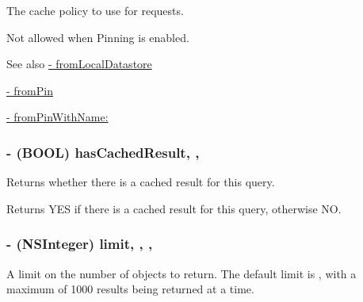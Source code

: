  





The cache policy to use for requests.

Not allowed when Pinning is enabled.

\begin{DoxySeeAlso}{See also}
\hyperlink{class_p_f_query_a04816c50721c554db2349cfbe637472f}{-\/ from\+Local\+Datastore} 

\hyperlink{class_p_f_query_aec25334cc9bf9c212e0e0d6587603787}{-\/ from\+Pin} 

\hyperlink{class_p_f_query_ae996e0bc5432da802523435319d7fd9f}{-\/ from\+Pin\+With\+Name\+:} 
\end{DoxySeeAlso}
\hypertarget{class_p_f_query_a7b45d0efdce5b559714f9a6b6f40b972}{}
\subsubsection[{has\+Cached\+Result}]{\setlength{\rightskip}{0pt plus 5cm}-\/ (B\+O\+O\+L) has\+Cached\+Result\hspace{0.3cm}{\ttfamily [read]}, {\ttfamily [nonatomic]}, {\ttfamily [assign]}}\label{class_p_f_query_a7b45d0efdce5b559714f9a6b6f40b972}
Returns whether there is a cached result for this query.

\begin{DoxyReturn}{Returns}
{\ttfamily Y\+E\+S} if there is a cached result for this query, otherwise {\ttfamily N\+O}. 
\end{DoxyReturn}
\hypertarget{class_p_f_query_a78060204fccd16a9ac9718b219778b64}{}
\subsubsection[{limit}]{\setlength{\rightskip}{0pt plus 5cm}-\/ (N\+S\+Integer) limit\hspace{0.3cm}{\ttfamily [read]}, {\ttfamily [write]}, {\ttfamily [nonatomic]}, {\ttfamily [assign]}}\label{class_p_f_query_a78060204fccd16a9ac9718b219778b64}




 





A limit on the number of objects to return. The default limit is {}, with a maximum of 1000 results being returned at a time.

